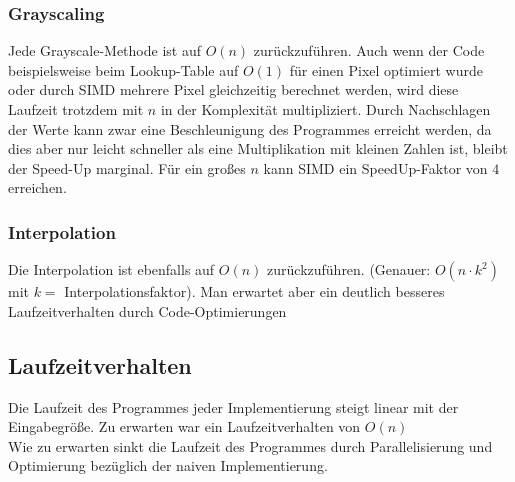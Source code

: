 \documentclass[course=erap]{aspdoc}
\begin{document}
\subsubsection{Grayscaling}
Jede Grayscale-Methode ist auf $O(n)$ zurückzuführen. Auch wenn der Code beispielsweise beim Lookup-Table auf $O(1)$ für einen Pixel optimiert wurde oder durch SIMD mehrere Pixel gleichzeitig berechnet werden, wird diese Laufzeit trotzdem mit $n$ in der Komplexität multipliziert. Durch Nachschlagen der Werte kann zwar eine Beschleunigung des Programmes erreicht werden, da dies aber nur leicht schneller als eine Multiplikation mit kleinen Zahlen ist, bleibt der Speed-Up marginal. Für ein großes $n$ kann SIMD ein SpeedUp-Faktor von $4$ erreichen.

\subsubsection{Interpolation}
Die Interpolation ist ebenfalls auf $O(n)$ zurückzuführen. (Genauer: $O(n \cdot k^{2})$ mit $k =$ Interpolationsfaktor). Man erwartet aber ein deutlich besseres Laufzeitverhalten durch Code-Optimierungen

\subsection{Laufzeitverhalten}
Die Laufzeit des Programmes jeder Implementierung steigt linear mit der Eingabegröße. Zu erwarten war ein Laufzeitverhalten von $O(n)$\\
Wie zu erwarten sinkt die Laufzeit des Programmes durch Parallelisierung und Optimierung bezüglich der naiven Implementierung.
\end{document}
